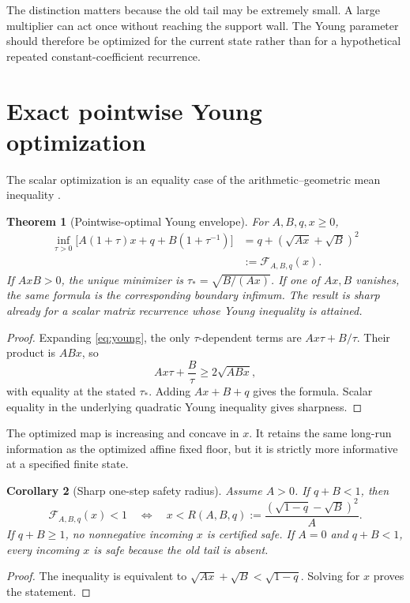\documentclass[12pt]{article}
\newtheorem{theorem}{Theorem}
\newtheorem{corollary}[theorem]{Corollary}
\begin{document}
The distinction matters because the old tail may be extremely small.  A
large multiplier can act once without reaching the support wall.  The Young
parameter should therefore be optimized for the current state rather than
for a hypothetical repeated constant-coefficient recurrence.

\section{Exact pointwise Young optimization}
The scalar optimization is an equality case of the arithmetic--geometric
mean inequality \citep{HardyLittlewoodPolya1952}.

\begin{theorem}[Pointwise-optimal Young envelope]\label{thm:envelope}
For $A,B,q,x\geq0$,
\begin{align*}
 \inf_{\tau>0}\bigl[A(1+\tau)x+q+B(1+\tau^{-1})\bigr]
 &=q+(\sqrt{Ax}+\sqrt B)^2\\
 &:=\mathcal F_{A,B,q}(x).
\end{align*}
If $AxB>0$, the unique minimizer is
$\tau_*=\sqrt{B/(Ax)}$.  If one of $Ax,B$ vanishes, the same formula is the
corresponding boundary infimum.  The result is sharp already for a scalar
matrix recurrence whose Young inequality is attained.
\end{theorem}

\begin{proof}
Expanding \eqref{eq:young}, the only $\tau$-dependent terms are
$Ax\tau+B/\tau$.  Their product is $ABx$, so
\[
 Ax\tau+\frac B\tau\geq2\sqrt{ABx},
\]
with equality at the stated $\tau_*$.  Adding $Ax+B+q$ gives the formula.
Scalar equality in the underlying quadratic Young inequality gives
sharpness.
\end{proof}

The optimized map is increasing and concave in $x$.  It retains the same
long-run information as the optimized affine fixed floor, but it is strictly
more informative at a specified finite state.

\begin{corollary}[Sharp one-step safety radius]\label{cor:radius}
Assume $A>0$.  If $q+B<1$, then
\[
 \mathcal F_{A,B,q}(x)<1
 \quad\Longleftrightarrow\quad
 x<R(A,B,q):=\frac{(\sqrt{1-q}-\sqrt B)^2}{A}.
\]
If $q+B\geq1$, no nonnegative incoming $x$ is certified safe.  If $A=0$ and
$q+B<1$, every incoming $x$ is safe because the old tail is absent.
\end{corollary}

\begin{proof}
The inequality is equivalent to
$\sqrt{Ax}+\sqrt B<\sqrt{1-q}$.  Solving for $x$ proves the statement.
\end{proof}
\end{document}
